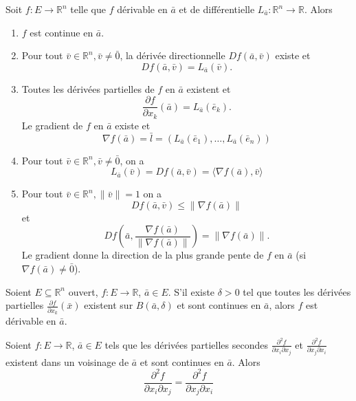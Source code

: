 \documentclass{report}
\newcommand*{\norm}[1]{\lVert#1\rVert}
\begin{document}
\begin{thm}
	Soit $f : E \to \mathbb R^n$ telle que $f$ dérivable en $\bar a$ et de différentielle $L_{\bar a}: \mathbb R^n \to \mathbb R$. Alors
	\begin{enumerate}
		\item $f$ est continue en $\bar a$.
		\item Pour tout $\bar v \in \mathbb R^n, \bar v \neq \bar 0$, la dérivée directionnelle $D f(\bar a, \bar v)$ existe et
		\begin{equation}
			D f(\bar a, \bar v) = L_{\bar a}(\bar v).
		\end{equation}
		\item Toutes les dérivées partielles de $f$ en $\bar a$ existent et		
		\begin{equation}
			\frac{\partial f}{\partial x_k}(\bar a) = L_{\bar a}(\bar e_k).
		\end{equation}
		Le gradient de $f$ en $\bar a$ existe et
		\begin{equation}
			\nabla f(\bar a) = \bar l = (L_{\bar a}(\bar e_1), \ldots, L_{\bar a}(\bar e_n))
		\end{equation}
		\item Pour tout $\bar v \in \mathbb R^n, \bar v \neq \bar 0$, on a
		\begin{equation}
			L_{\bar a}(\bar v) = D f(\bar a, \bar v) = \langle \nabla f(\bar a), \bar v \rangle
		\end{equation}
		\item Pour tout $\bar v \in \mathbb R^n, \norm{\bar v} = 1$ on a
		\begin{equation}
			D f(\bar a, \bar v) \leq \norm{\nabla f(\bar a)}
		\end{equation}
		et
		\begin{equation}
			D f\left(\bar a, \frac{\nabla f(\bar a)}{\norm{\nabla f(\bar a)}}\right) = \norm{\nabla f(\bar a)}.
		\end{equation}
		Le gradient donne la direction de la plus grande pente de $f$ en $\bar a$ (si $\nabla f(\bar a) \neq \bar 0$).
	\end{enumerate}
\end{thm}

\begin{thm}[dérivabilité 2]\label{thm:derivabilite2}
	Soient $E \subseteq \mathbb R^n$ ouvert, $f : E \to \mathbb R$, $\bar a \in E$. S'il existe $\delta > 0$ tel que toutes les dérivées partielles $\frac{\partial f}{\partial x_k}(\bar x)$ existent sur $B(\bar a, \delta)$ et sont continues en $\bar a$, alors $f$ est dérivable en $\bar a$.
\end{thm}

\begin{thm}[Schwartz]
	Soient $f : E \to \mathbb R$, $\bar a \in E$ tels que les dérivées partielles secondes $\frac{\partial^2 f}{\partial x_i \partial x_j}$ et $\frac{\partial^2 f}{\partial x_j \partial x_i}$ existent dans un voisinage de $\bar a$ et sont continues en $\bar a$. Alors
	\begin{equation}
		\frac{\partial^2 f}{\partial x_i \partial x_j} = 		\frac{\partial^2 f}{\partial x_j \partial x_i}
	\end{equation}
\end{thm}
\end{document}
